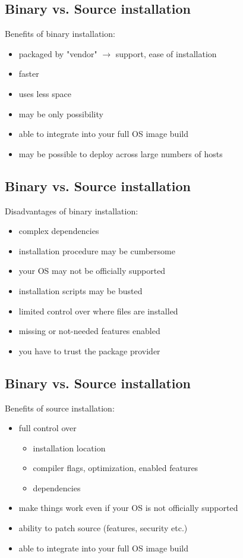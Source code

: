 \documentclass[xga]{xdvislides}
\begin{document}
\subsection{Binary vs. Source installation}
Benefits of binary installation:
\begin{itemize}
	\item packaged by "vendor" $\rightarrow$ support, ease of installation
	\item faster
	\item uses less space
	\item may be only possibility
	\item able to integrate into your full OS image build
	\item may be possible to deploy across large numbers of hosts
\end{itemize}

\subsection{Binary vs. Source installation}
Disadvantages of binary installation:
\begin{itemize}
	\item complex dependencies
	\item installation procedure may be cumbersome
	\item your OS may not be officially supported
	\item installation scripts may be busted
	\item limited control over where files are installed
	\item missing or not-needed features enabled
	\item you have to trust the package provider
\end{itemize}

\subsection{Binary vs. Source installation}
Benefits of source installation:
\begin{itemize}
	\item full control over
		\begin{itemize}
			\item installation location
			\item compiler flags, optimization, enabled features
			\item dependencies
		\end{itemize}
	\item make things work even if your OS is not officially supported
	\item ability to patch source (features, security etc.)
	\item able to integrate into your full OS image build
\end{itemize}
\end{document}
